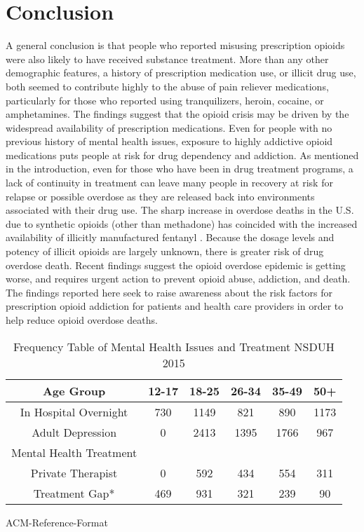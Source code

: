 \documentclass[sigconf]{acmart}
\begin{document}
\section{Conclusion}

A general conclusion is that people who reported misusing prescription opioids 
were also likely to have received substance treatment. More than any other 
demographic features, a history of prescription medication use, or illicit drug 
use, both seemed to contribute highly to the abuse of pain reliever medications, 
particularly for those who reported using tranquilizers, heroin, cocaine, or 
amphetamines. The findings suggest that the opioid crisis may be driven by the 
widespread availability of prescription medications. Even for people with no 
previous history of mental health issues, exposure to highly addictive opioid 
medications puts people at risk for drug dependency and addiction. As mentioned 
in the introduction, even for those who have been in drug treatment programs, 
a lack of continuity in treatment can leave many people in recovery at risk 
for relapse or possible overdose as they are released back into environments 
associated with their drug use. The sharp increase in overdose deaths in the 
U.S. due to synthetic opioids (other than methadone) has coincided with the 
increased availability of illicitly manufactured fentanyl \cite{nida17}. 
Because the dosage levels and potency of illicit opioids are largely unknown, 
there is greater risk of drug overdose death. Recent findings suggest the 
opioid overdose epidemic is getting worse, and requires urgent action to prevent 
opioid abuse, addiction, and death. The findings reported here seek to raise 
awareness about the risk factors for prescription opioid addiction for patients 
and health care providers in order to help reduce opioid overdose deaths. 



\begin{table}
  \caption{Frequency Table of Mental Health Issues and Treatment NSDUH 2015
  \cite{samhsa16}}
  \label{tab:freq}
  \begin{tabular}{cccccc}
    \toprule
    Age Group & 12-17& 18-25& 26-34& 35-49& 50+\\
    \midrule
    In Hospital Overnight& 730& 1149& 821& 890& 1173 \\
    Adult Depression& 0& 2413& 1395& 1766& 967 \\
    \midrule
    Mental Health Treatment& & & & & \\
    \midrule
    Private Therapist& 0& 592& 434& 554& 311 \\
    Treatment Gap*& 469& 931& 321& 239& 90 \\
    \bottomrule
  \end{tabular}
\end{table}
ACM-Reference-Format

 
\end{document}
